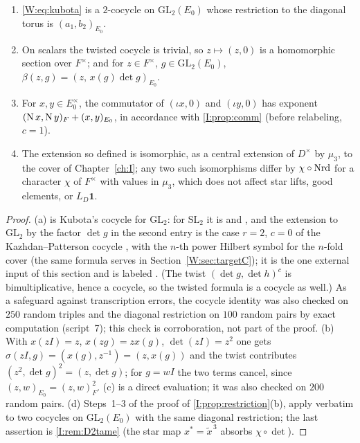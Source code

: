 \begin{lemma}\label{W:lem:model}
\begin{enumerate}[label=(\alph*)]
\item \eqref{W:eq:kubota} is a $2$-cocycle on $\mathrm{GL}_2(E_0)$ whose
restriction to the diagonal torus is $(a_1,b_2)_{E_0}$.
\item On scalars the twisted cocycle is trivial, so $z\mapsto(z,0)$ is a
homomorphic section over $F^\times$; and for $z\in F^\times$, $g\in\mathrm{GL}_2(E_0)$,
$\beta(z,g)=(z,\,x(g)\det g)_{E_0}$.
\item For $x,y\in E_0^\times$, the commutator of $(\iota x,0)$ and
$(\iota y,0)$ has exponent $(\operatorname N x,\operatorname N y)_F+(x,y)_{E_0}$, in accordance
with \cref{I:prop:comm} (before relabeling, $c=1$).
\item The extension so defined is isomorphic, as a central extension of
$D^\times$ by $\mu_3$, to the cover of Chapter~\ref{ch:I}; any two such isomorphisms
differ by $\chi\circ\operatorname{Nrd}$ for a character $\chi$ of $F^\times$ with
values in $\mu_3$, which does not affect star lifts, good elements, or
$L_D\mathbf1$.
\end{enumerate}
\end{lemma}
\begin{proof}
(a) is Kubota's cocycle for $\mathrm{GL}_2$: for $\mathrm{SL}_2$ it is
\cite[Thm.~2]{Kub67} and \cite[Ch.~1]{Kub69}, and the extension to $\mathrm{GL}_2$ by
the factor $\det g$ in the second entry is the case $r=2$, $c=0$ of the
Kazhdan--Patterson cocycle \cite[\S0.1]{KP84}, with the $n$-th power Hilbert
symbol for the $n$-fold cover (the same formula serves in
Section~\ref{W:sec:targetC}); it is the one external input of this section
and is labeled \Etag.  (The twist $(\det g,\det h)^{c}$ is
bimultiplicative, hence a cocycle, so the twisted formula is a cocycle
as well.)  As a safeguard against transcription errors, the cocycle
identity was also checked on $250$ random triples and the diagonal
restriction on $100$ random pairs by exact computation (script~7); this
check is corroboration, not part of the proof.  (b) With $x(zI)=z$, $x(zg)=zx(g)$, $\det(zI)=z^2$ one gets
$\sigma(zI,g)=(x(g),z^{-1})=(z,x(g))$ and the twist contributes
$(z^2,\det g)^2=(z,\det g)$; for $g=wI$ the two terms cancel, since
$(z,w)_{E_0}=(z,w)_F^2$.  (c) is a direct evaluation; it was also
checked on $200$ random pairs.  (d) Steps~1--3 of the proof of \cref{I:prop:restriction}(b), apply verbatim to two cocycles on $\mathrm{GL}_2(E_0)$
with the same diagonal restriction; the last assertion is \cref{I:rem:D2tame} (the star map $x^*=\tilde x^{\,3}$ absorbs $\chi\circ\det$).
\end{proof}

